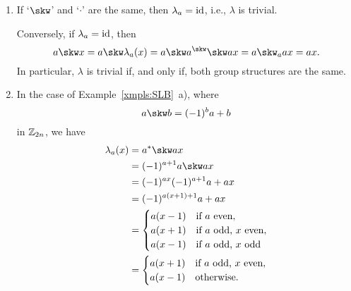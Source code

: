 \begin{xmpls}\label{xmpls:lambda}${}$
    \begin{enumerate}[\rm a)]
        \item If `$\skw$' and `$\cdot$' are the same, then $\lambda_a=\operatorname{id}$, i.e., $\lambda$ is trivial. 
        
        Conversely, if $\lambda_a=\operatorname{id}$, then
        $$
            a\skw x = a\skw\lambda_a(x)
                = a\skw a^\skw\skw ax
                = a\skw_a ax
                = ax.
        $$
        In particular, $\lambda$ is trivial if, and only if, both group structures are the same.

        \item In the case of Example~\ref{xmpls:SLB}~a), where
        $$
            a\skw b = (-1)^ba + b
        $$
        in $\mathbb{Z}_{2n}$, we have
        \begin{align*}
            \lambda_a(x) &= a^*\skw ax\\
                &= (-1)^{a+1}a\skw ax\\
                &= (-1)^{ax}(-1)^{a+1}a + ax\\
                &= (-1)^{a(x+1)+1}a+ax\\
                &= \begin{cases}
                    a(x-1)  &\text{if $a$ even},\\
                    a(x+1) &\text{if $a$ odd, $x$ even},\\
                    a(x-1) &\text{if $a$ odd, $x$ odd}
                \end{cases}\\
                &= \begin{cases}
                    a(x+1) &\text{if $a$ odd, $x$ even},\\
                    a(x-1) &\text{otherwise}.
                \end{cases}
        \end{align*}


\end{enumerate}
\end{xmpls}
